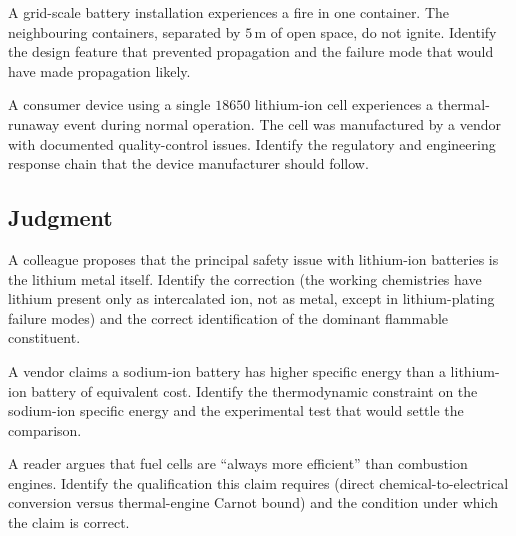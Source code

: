 \begin{exercise}
A grid-scale battery installation experiences a fire in one
container. The neighbouring containers, separated by $5\,\text{m}$
of open space, do not ignite. Identify the design feature that
prevented propagation and the failure mode that would have made
propagation likely.
\end{exercise}

\begin{exercise}
A consumer device using a single $18650$ lithium-ion cell experiences
a thermal-runaway event during normal operation. The cell was
manufactured by a vendor with documented quality-control issues.
Identify the regulatory and engineering response chain that the
device manufacturer should follow.
\end{exercise}

\subsection*{Judgment}

\begin{exercise}
A colleague proposes that the principal safety issue with lithium-ion
batteries is the lithium metal itself. Identify the correction (the
working chemistries have lithium present only as intercalated ion,
not as metal, except in lithium-plating failure modes) and the
correct identification of the dominant flammable constituent.
\end{exercise}

\begin{exercise}
A vendor claims a sodium-ion battery has higher specific energy than
a lithium-ion battery of equivalent cost. Identify the thermodynamic
constraint on the sodium-ion specific energy and the experimental
test that would settle the comparison.
\end{exercise}

\begin{exercise}
A reader argues that fuel cells are ``always more efficient'' than
combustion engines. Identify the qualification this claim requires
(direct chemical-to-electrical conversion versus thermal-engine
Carnot bound) and the condition under which the claim is correct.
\end{exercise}
